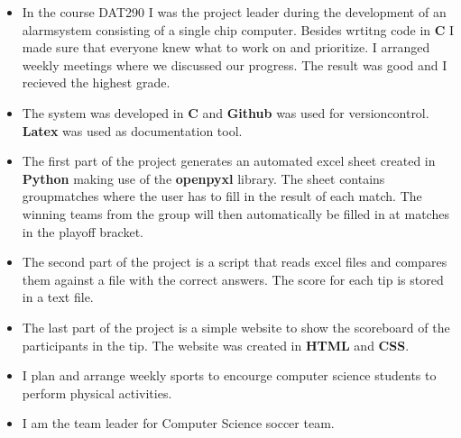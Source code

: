 \documentclass[10pt,a4paper,ragged2e]{altacv}
\begin{document}
\begin{fullwidth}

\begin{itemize}
  \item In the course DAT290 I was the project leader during the development of an alarmsystem 
  consisting of a single chip computer. Besides wrtitng code in \textbf{C} I made sure that everyone 
  knew what to work on and prioritize. I arranged weekly meetings where we discussed our progress. 
  The result was good and I recieved the highest grade.
  \item The system was developed in \textbf{C} and \textbf{Github} was used for versioncontrol.
  \textbf{Latex} was used as documentation tool.
   
\end{itemize}

\divider

\begin{itemize}
  \item The first part of the project generates an automated excel sheet created in \textbf{Python} 
  making use of the \textbf{openpyxl} library. The sheet contains groupmatches where the user has 
  to fill in the result of each match. The winning teams from the group will then automatically be filled in 
  at matches in the playoff bracket.
  \item The second part of the project is a script that reads excel files and compares them
  against a file with the correct answers. The score for each tip is stored in a text file.
  \item The last part of the project is a simple website to show the scoreboard of the participants in the tip.
   The website was created in \textbf{HTML} and \textbf{CSS}.
\end{itemize}


\begin{itemize}
  \item I plan and arrange weekly sports to encourge computer science students
   to perform physical activities. 
  \item I am the team leader for Computer Science soccer team.
\end{itemize}


\end{fullwidth}
\end{document}
